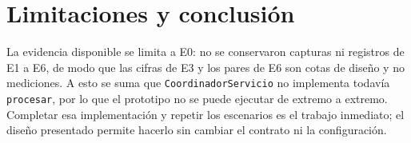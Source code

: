 \documentclass[10pt]{article}
\newcommand{\cod}[1]{\texttt{#1}}
\begin{document}
\section{Limitaciones y conclusión}

La evidencia disponible se limita a E0: no se conservaron capturas ni
registros de E1 a E6, de modo que las cifras de E3 y los pares de E6 son cotas
de diseño y no mediciones. A esto se suma que \cod{CoordinadorServicio} no
implementa todavía \cod{procesar}, por lo que el prototipo no se puede ejecutar
de extremo a extremo. Completar esa implementación y repetir los escenarios es
el trabajo inmediato; el diseño presentado permite hacerlo sin cambiar el
contrato ni la configuración.
\end{document}
